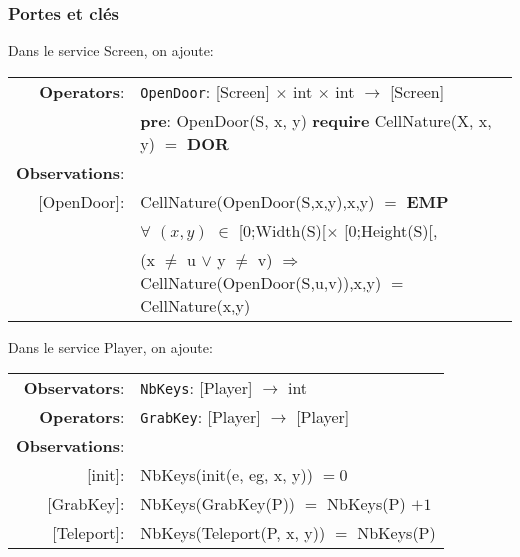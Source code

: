 \documentclass[8pt]{article}
\begin{document}
\subsubsection{Portes et clés}

Dans le service \textrm{Screen}, on ajoute:
{\small
  \begin{longtable}{rl}
    \textbf{Operators}: & \texttt{OpenDoor}: \textrm{[Screen]} $\times$ \textrm{int} $\times$ \textrm{int}  $\rightarrow$ \textrm{[Screen]} \\
    & \quad\quad \textbf{pre}: \textrm{OpenDoor(S, x, y)} \textbf{require} \textrm{CellNature(X, x, y)} $=$ \textbf{DOR}\\
    \textbf{Observations}:&\\
    \textrm{[OpenDoor]}: & \textrm{CellNature(OpenDoor(S,x,y),x,y)} $=$ \textbf{EMP} \\
    & $\forall$ $(x,y)$ $\in$ \textrm{[0;Width(S)[}$\times$ \textrm{[0;Height(S)[}, \\
    & \quad\quad (\textrm{x} $\neq$ \textrm{u} $\lor$ \textrm{y} $\neq$ \textrm{v}) $\Rightarrow$ \textrm{CellNature(OpenDoor(S,u,v)),x,y)} $=$ \textrm{CellNature(x,y)} \\
  \end{longtable}}

Dans le service \textrm{Player}, on ajoute:

{\small
  \begin{longtable}{rl}
    \textbf{Observators}:& \texttt{NbKeys}: \textrm{[Player]} $\rightarrow$ \textrm{int}\\
    \textbf{Operators}: & \texttt{GrabKey}: \textrm{[Player]} $\rightarrow$ \textrm{[Player]} \\
    \textbf{Observations}:&\\
    \textrm{[init]}:& \textrm{NbKeys(init(e, eg, x, y))} $= 0$\\
    \textrm{[GrabKey]}:& \textrm{NbKeys(GrabKey(P))} $=$ \textrm{NbKeys(P)} $+ 1$ \\
    \textrm{[Teleport]}:& \textrm{NbKeys(Teleport(P, x, y))} $=$ \textrm{NbKeys(P)}\\
  \end{longtable}}
\end{document}
